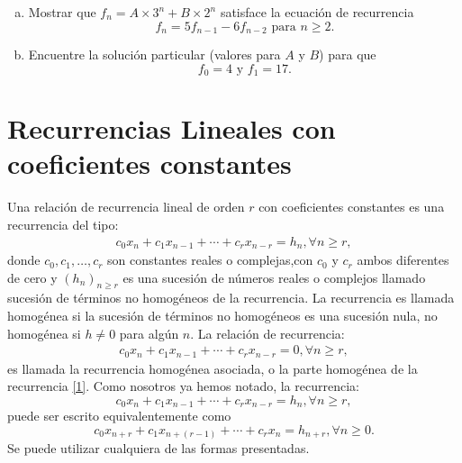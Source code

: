\begin{solution}
	
\end{solution}

\begin{exercise}
\begin{enumerate}[(a)]
	\item Mostrar que $f_{n}=A\times3^{n}+B\times2^{n}$ satisface la ecuación de recurrencia \[ f_{n}=5f_{n-1}-6f_{n-2}\text{ para }n\geq 2. \]
	\item Encuentre la solución particular (valores para $A$ y $B$) para que \[ f_{0}=4\text{ y }f_{1}=17. \]
\end{enumerate}

\end{exercise}

\section{Recurrencias Lineales con coeficientes constantes}

Una relación de recurrencia lineal de orden $r$ con coeficientes constantes es una recurrencia del tipo:
\begin{align}\label{1}
c_{0}x_{n}+c_{1}x_{n-1}+\cdots+c_{r}x_{n-r}=h_{n},\forall n\geq r,
\end{align}
donde $c_{0},c_{1},\ldots,c_{r}$ son constantes reales o complejas,con $c_{0}$ y $c_{r}$ ambos diferentes de cero y $(h_{n})_{n\geq r}$ es una sucesión de números reales o complejos llamado sucesión de términos no homogéneos de la recurrencia. La recurrencia es llamada homogénea si la sucesión de términos no homogéneos es una sucesión nula, no homogénea si $h\neq0 $ para algún $n$. La relación de recurrencia:
\begin{align}\label{2}
c_{0}x_{n}+c_{1}x_{n-1}+\cdots+c_{r}x_{n-r}=0,\forall n\geq r,
\end{align}
es llamada la recurrencia homogénea asociada, o la parte homogénea de la recurrencia \eqref{1}. Como nosotros ya hemos notado, la recurrencia:
\begin{equation*}
c_{0}x_{n}+c_{1}x_{n-1}+\cdots+c_{r}x_{n-r}=h_{n},\forall n\geq r,
\end{equation*}
puede ser escrito equivalentemente como
\begin{equation*}
c_{0}x_{n+r}+c_{1}x_{n+(r-1)}+\cdots+c_{r}x_{n}=h_{n+r},\forall n\geq 0.
\end{equation*}
Se puede utilizar cualquiera de las formas presentadas.

